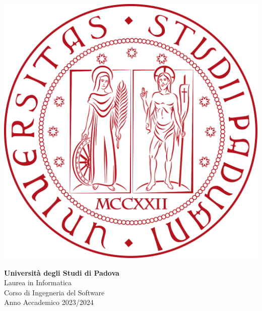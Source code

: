 \documentclass[a4paper, 11pt]{article}
\begin{document}
\begin{minipage}{0.35\linewidth}
    \includegraphics[width=\linewidth]{Logo_Universita_Padova.svg.png}
\end{minipage}\hfil
\begin{minipage}{0.55\linewidth}
\textbf{Università degli Studi di Padova} \\
Laurea in Informatica \\
Corso di Ingegneria del Software \\
Anno Accademico 2023/2024
\end{minipage}

\vspace{5mm}
\end{document}
